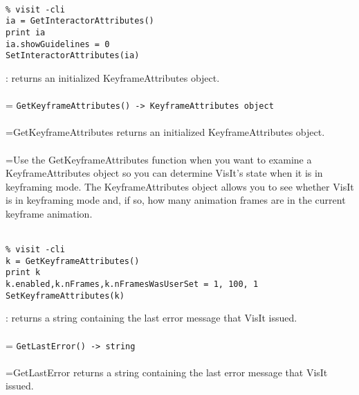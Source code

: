 \documentclass[10pt,a4paper]{report}
\begin{document}
\\[-6mm]
\begin{verbatim}% visit -cli
ia = GetInteractorAttributes()
print ia
ia.showGuidelines = 0
SetInteractorAttributes(ia)
\end{verbatim}
\newpage


{}
: returns an initialized KeyframeAttributes object.\\[-3mm]

 \\ 
\hangindent=\parindent 
\verb!GetKeyframeAttributes() -> KeyframeAttributes object!\\ [-3mm]

 \\ 
\hangindent=\parindent GetKeyframeAttributes returns an initialized KeyframeAttributes object. \\[-3mm] 

 \\ 
\hangindent=\parindent Use the GetKeyframeAttributes function when you want to examine a KeyframeAttributes object so you can determine VisIt's state when it is in keyframing mode. The KeyframeAttributes object allows you to see whether VisIt is in keyframing mode and, if so, how many animation frames are in the current keyframe animation. \\[-3mm] 

\\[-6mm]
\begin{verbatim}% visit -cli
k = GetKeyframeAttributes()
print k
k.enabled,k.nFrames,k.nFramesWasUserSet = 1, 100, 1
SetKeyframeAttributes(k)
\end{verbatim}
\newpage


{}
: returns a string containing the last error message that VisIt issued.\\[-3mm]

 \\ 
\hangindent=\parindent 
\verb!GetLastError() -> string!\\ [-3mm]

 \\ 
\hangindent=\parindent GetLastError returns a string containing the last error message that VisIt issued. \\[-3mm] 
\end{document}
